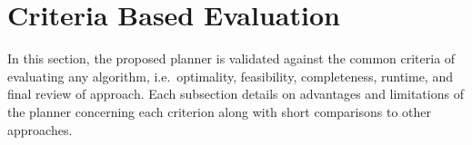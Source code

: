  




\section{Criteria Based Evaluation}
\label{criteria_based_eval}
In this section, the proposed planner is validated against the common criteria of evaluating any algorithm, i.e.\ optimality, feasibility, completeness, runtime, and final review of approach. Each subsection details on advantages and limitations of the planner concerning each criterion along with short comparisons to other approaches. 

